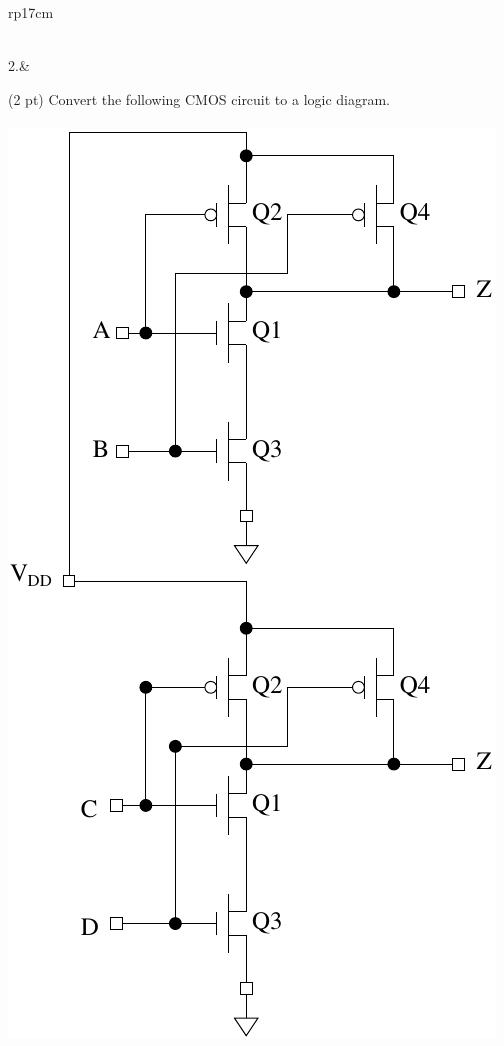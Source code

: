 \documentclass{article}
\begin{document}
\begin{longtable}[l]{rp{17cm}}
\begin{minipage}[t]{\linewidth}
\vspace{8cm
}
\end{minipage}\\
\medskip
2.&\begin{minipage}[t]{\linewidth}(2 pt) Convert the following CMOS circuit to a logic diagram.\\ \\
\includegraphics{../CMOSCircuits/Assessments/CMOSNANDNOR}


\end{minipage}
\end{longtable}
\end{document}
